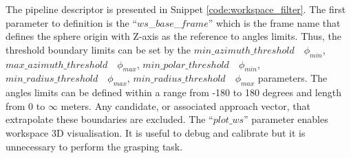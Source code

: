 \begin{figure}[h!] %
\end{figure}

The pipeline descriptor is presented in Snippet \ref{code:workspace_filter}. The first parameter to definition is the ``$ws$\_$base$\_$frame$'' which is the frame name that defines the sphere origin with Z-axis as the reference to angles limits. Thus, the threshold boundary limits can be set by the $min\_azimuth\_threshold \quad \phi_{min}$, $max\_azimuth\_threshold \quad \phi_{max}$, $min\_polar\_threshold \quad \phi_{min}$, $min\_radius\_threshold \quad \phi_{max}$, $min\_radius\_threshold \quad \phi_{max}$ parameters. The angles limits can be defined within a range from -180 to 180 degrees and length from 0 to $\infty$ meters. Any candidate, or associated approach vector, that extrapolate these boundaries are excluded. The ``$plot\_ws$'' parameter enables workspace 3D visualisation. It is useful to debug and calibrate but it is unnecessary to perform the grasping task.





